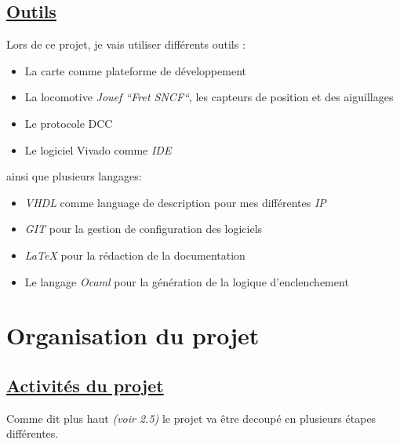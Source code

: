 \newpage
\subsection{\underline{Outils}}
\label{sec:outils}

Lors de ce projet, je vais utiliser diff\'erents outils :
\begin{itemize}
  \item La carte \crt comme plateforme de d\'eveloppement
  \item La locomotive \emph{Jouef ``Fret SNCF``}\cite{Jouef}, les capteurs de
    position et des aiguillages
  \item Le protocole DCC \cite{DCC}
  \item Le logiciel Vivado comme \emph{IDE}
\end{itemize}

ainsi que plusieurs langages:
\begin{itemize}
  \item \emph{VHDL}\cite{VHDL} comme language de description pour mes diff\'erentes
    \emph{IP}
  \item \emph{GIT}\cite{GIT} pour la gestion de configuration des logiciels
  \item \emph{\LaTeX}\cite{LATEX} pour la r\'edaction de la documentation
  \item Le langage \emph{Ocaml}\cite{OCAML} pour la g\'en\'eration de la logique d'enclenchement
\end{itemize}


\section{Organisation du projet}
\label{sec:org_proj}

\subsection{\underline{Activit\'es du projet}}
\label{sec:activ}

Comme dit plus haut \emph{(voir 2.5)} le projet va \^etre decoup\'e en
plusieurs \'etapes diff\'erentes.

